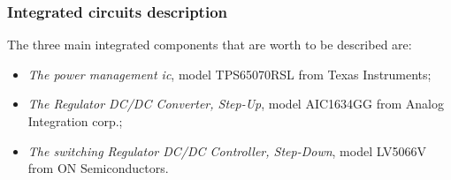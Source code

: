 \documentclass[11pt,a4paper,titlepage]{article}
\begin{document}
		  \subsubsection{Integrated circuits description}
				The three main integrated components that are worth to be described are:
				\begin{itemize}
				  \item \textit{The power management \gls{ic}}, model TPS65070RSL from Texas Instruments;
				  \item \textit{The Regulator DC/DC Converter, Step-Up}, model AIC1634GG from Analog Integration corp.;
				  \item \textit{The switching Regulator DC/DC Controller, Step-Down}, model LV5066V from ON Semiconductors.
				\end{itemize}
\end{document}
